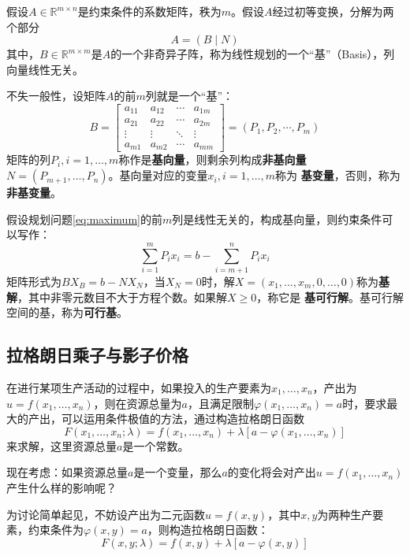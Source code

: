 假设$A\in \mathbb{R}^{m \times n}$是约束条件的系数矩阵，秩为$m$。假设$A$经过初等变换，分解为两个部分
\[
    A=(B\mid N)
\]
其中，$B\in\mathbb{R}^{m\times m}$是$A$的一个非奇异子阵，称为线性规划的一个“基”（Basis），列向量线性无关。

不失一般性，设矩阵$A$的前$m$列就是一个“基”：
\begin{equation}\label{eq:basis}
B =
    \begin{bmatrix}
        a_{11} & a_{12} & \cdots & a_{1m}\\
        a_{21} & a_{22} & \cdots & a_{2m}\\
        \vdots & \vdots & \ddots & \vdots\\
        a_{m1} & a_{m2} & \cdots & a_{mm}
    \end{bmatrix}
=(P_1, P_2 , \cdots , P_m)
\end{equation}
矩阵的列$P_i, i=1,\ldots,m$称作是\textbf{基向量}，则剩余列构成\textbf{非基向量}$N=(P_{m+1},\ldots,P_n)$。基向量对应的变量$x_i,i=1,\ldots,m$称为
\textbf{基变量}，否则，称为\textbf{非基变量}。

假设规划问题\eqref{eq:maximum}的前$m$列是线性无关的，构成基向量，则约束条件可以写作：
\begin{equation}
    \sum\limits_{i=1}^m P_i x_i = b - \sum\limits_{i=m+1}^n P_i x_i
\end{equation}
矩阵形式为$B X_B = b - N X_N$，当$X_N=0$时，解$X=(x_1,\ldots,x_m,0,\ldots,0)$称为\textbf{基解}，其中非零元数目不大于方程个数。如果解$X\ge 0$，称它是
\textbf{基可行解}。基可行解空间的基，称为\textbf{可行基}。

\subsection{拉格朗日乘子与影子价格}
在进行某项生产活动的过程中，如果投入的生产要素为$x_1,\ldots, x_n$，产出为$u = f(x_1,\ldots, x_n)$，则在资源总量为$a$，且满足限制$\varphi(x_1,\ldots, x_n) = a$时，要求最大的产出，可以运用条件极值的方法，通过构造拉格朗日函数
\begin{equation}
  F(x_1,\ldots,x_n; \lambda) = f(x_1,\ldots, x_n) + \lambda[a - \varphi(x_1,\ldots, x_n)]
\end{equation}
来求解，这里资源总量$a$是一个常数。

现在考虑：如果资源总量$a$是一个变量，那么$a$的变化将会对产出$u = f(x_1,\ldots, x_n)$产生什么样的影响呢？

为讨论简单起见，不妨设产出为二元函数$u = f(x,y)$，其中$x,y$为两种生产要素，约束条件为$\varphi(x, y) = a$，则构造拉格朗日函数：
\begin{equation}
 F(x,y; \lambda) = f(x,y) + \lambda[a - \varphi(x,y)]
\end{equation}

